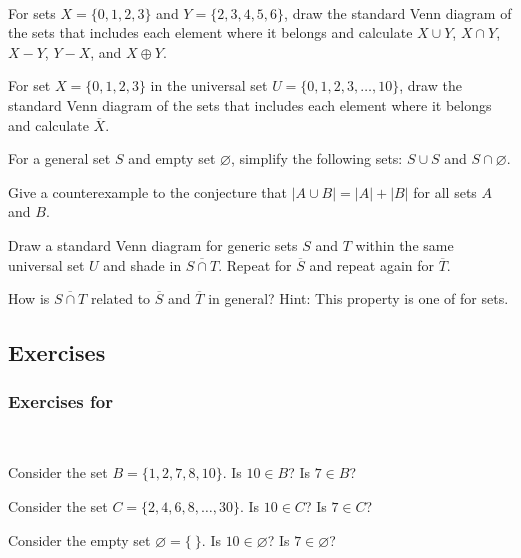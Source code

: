 \begin{act}
\label{act_set_ops}
~
    \begin{actpart}
        \item For sets $X = \{0,1,2,3\}$ and $Y=\{2,3,4,5,6\}$, draw the standard Venn diagram of the sets that includes each element where it belongs and calculate $X \cup Y$, $X \cap Y$, $X - Y$, $Y-X$, and $X \oplus Y$.
        \item For set $X = \{0,1,2,3\}$ in the universal set $U = \{0,1,2,3, \ldots, 10\}$, draw the standard Venn diagram of the sets that includes each element where it belongs and calculate $\overline{X}$.
        \item For a general set $S$ and empty set $\varnothing$, simplify the following sets: $S \cup S$ and $S \cap \varnothing$.
        \item Give a counterexample to the conjecture that 
        $\left| A \cup B \right| =  \left|  A \right|+ \left| B \right|$ for all sets $A$ and $B$.
        \item Draw a standard Venn diagram for generic sets $S$ and $T$ within the same universal set $U$ and shade in $\overline{S \cap T}$.  Repeat for $\overline{S}$ and repeat again for $\overline{T}$.  
        \item How is $\overline{S \cap T}$ related to $\overline{S}$ and $\overline{T}$ in general? Hint: This property is one of  for sets.
    \end{actpart}
\end{act}


\subsection{Exercises}


\subsubsection*{Exercises for 
\subelements}

\begin{exer}[\exerP] %
\label{exer_decide_element_finite}  
~
    \begin{exerpart}
        \item Consider the set $B= \{1,2,7,8,10\}$. Is $10 \in B$?  Is $7 \in B$? 
        \item Consider the set $C = \{2,4,6,8,\ldots, 30\}$.  Is $10 \in C$?  Is $7 \in C$? 
        \item Consider the empty set $\varnothing=\{ ~\}$. Is $10 \in \varnothing$?  Is $7 \in \varnothing$? 
    \end{exerpart}
\end{exer}

